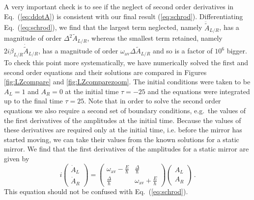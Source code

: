 \documentclass[twocolumn,english,pra,aps,superscriptaddress,floatfix]{revtex4-1}
\begin{document}
A very important check is to see if the neglect of second order derivatives in Eq.\ (\ref{eq:ddotA}) is consistent with our final result (\ref{eq:schrod}). Differentiating Eq.\ (\ref{eq:schrod}), we find that the largest term neglected, namely $\ddot{\tilde{A}}_{L/R}$, has a magnitude of order $\Delta^2 \tilde{A}_{L/R} $, whereas the smallest term retained, namely $2 i \beta_{L/R} \dot{\tilde{A}}_{L/R}$, has a magnitude of order $\omega_{\mathrm{av}} \Delta \tilde{A}_{L/R} $ and so is a factor of $10^6$ bigger. To check this point more systematically, we have numerically solved the first and second order equations and their solutions are
compared in Figures \ref{fig:LZcompare} and \ref{fig:LZcomparezoom}. The initial conditions were taken to be $A_{L}=1$ and $A_{R}=0$ at the initial time $\tau=-25$ and the equations were integrated up to the final time  $\tau=25$. Note that in order to solve the second order equations we also require a second set of boundary conditions, e.g.\ the values of the first derivatives of the amplitudes at the initial time. Because the values of these derivatives are required only at the initial time, i.e. before the mirror has started moving, we can take their values from the known solutions for a static mirror. We find that the first derivatives of the amplitudes for a static mirror are given by
\begin{equation}
i\left(\begin{array}{c}\dot{A}_{L}  \\ \dot{A}_{R}\end{array}\right)=\left(\begin{array}{cc} \omega_{\mathrm{av}}-\frac{E}{\hbar} & \frac{\Delta}{\hbar} \\  \frac{\Delta}{\hbar} & \omega_{\mathrm{av}}+\frac{E}{\hbar}  \end{array}\right)\left(\begin{array}{c} A_{L}  \\ A_{R}\end{array}\right) \, .
\label{eq:secondbc}
\end{equation}
This equation should not be confused with Eq.\ (\ref{eq:schrod}).
\end{document}
